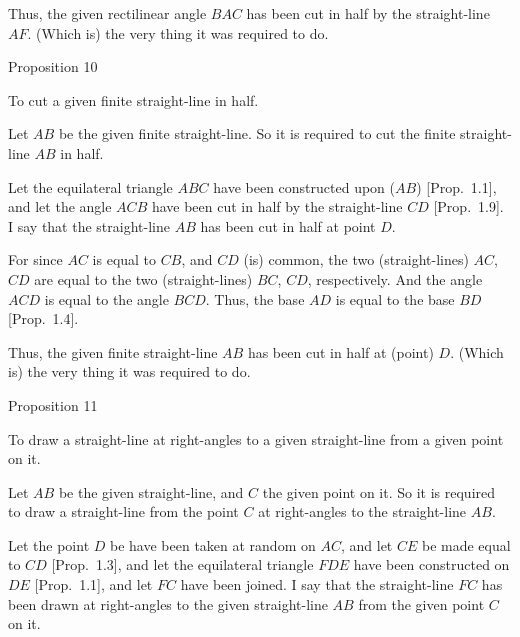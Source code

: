Thus, the given rectilinear angle $BAC$ has been cut in half by the
straight-line $AF$. (Which is) the very thing it was required to do.


\begin{center}
{\large Proposition 10}
\end{center}

To cut a given finite straight-line in half.

Let $AB$ be the given finite straight-line. So it is required to cut the
finite straight-line $AB$ in half.

Let the equilateral triangle $ABC$ have been constructed upon  ($AB$)
[Prop.~1.1], and let the angle $ACB$ have been cut in half by the
straight-line $CD$ [Prop.~1.9]. I say that the straight-line $AB$ has been
cut in half at  point $D$.

For since $AC$ is equal to $CB$, and $CD$ (is) common, the two (straight-lines) $AC$, $CD$
are equal to the two (straight-lines) $BC$, $CD$, respectively. And the angle $ACD$ is
equal to the angle $BCD$. Thus, the base $AD$ is equal to the base $BD$
[Prop.~1.4].

\epsfysize=2in
\centerline{}

Thus, the given finite straight-line $AB$ has been cut in half at  (point) $D$. 
(Which is) the
very thing it was required to do.


\begin{center}
{\large Proposition 11}
\end{center}

To draw a straight-line at right-angles to a given straight-line from a given point on it.

\epsfysize=1.8in
\centerline{}

Let $AB$ be the given straight-line, and $C$ the given point on it. So it is required
to draw a straight-line from the point $C$ at right-angles to the straight-line $AB$.

Let the point $D$ be have been taken at random on $AC$, and let $CE$ be made equal to $CD$ [Prop.~1.3], and let the equilateral triangle $FDE$
have been constructed on $DE$ [Prop.~1.1], and let $FC$ have been
joined. I say that the straight-line $FC$ has been drawn at right-angles
to the given straight-line $AB$ from the given point $C$ on it.

